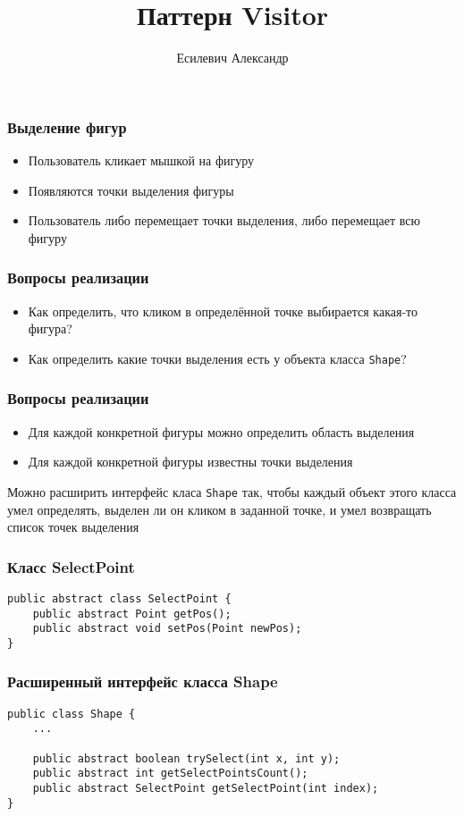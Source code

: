 \documentclass[handout]{beamer}
\title{Паттерн Visitor}
\author{Есилевич Александр}
\begin{document}
\maketitle

\begin{frame}[fragile]
\frametitle{Выделение фигур}
\begin{itemize}
\item Пользователь кликает мышкой на фигуру
\item Появляются точки выделения фигуры
\item Пользователь либо перемещает точки выделения, либо перемещает всю фигуру
\end{itemize}
\end{frame}


\begin{frame}[fragile]
\frametitle{Вопросы реализации}
\begin{itemize}
\item Как определить, что кликом в определённой точке выбирается какая-то фигура?
\item Как определить какие точки выделения есть у объекта класса \lstinline{Shape}?
\end{itemize}
\end{frame}


\begin{frame}[fragile]
\frametitle{Вопросы реализации}
\begin{itemize}
\item Для каждой конкретной фигуры можно определить область выделения
\item Для каждой конкретной фигуры известны точки выделения
\end{itemize}

\vspace{1cm}

Можно расширить интерфейс класа \lstinline{Shape} так, чтобы каждый объект
этого класса умел определять, выделен ли он кликом в заданной точке, и 
умел возвращать список точек выделения
\end{frame}


\begin{frame}[fragile]
\frametitle{Класс SelectPoint}
\begin{lstlisting}
public abstract class SelectPoint {
    public abstract Point getPos();
    public abstract void setPos(Point newPos);
}
\end{lstlisting}
\end{frame}


\begin{frame}[fragile]
\frametitle{Расширенный интерфейс класса Shape}
\begin{lstlisting}
public class Shape {
    ...
    
    public abstract boolean trySelect(int x, int y);
    public abstract int getSelectPointsCount();
    public abstract SelectPoint getSelectPoint(int index);
}
\end{lstlisting}
\end{frame}
\end{document}
